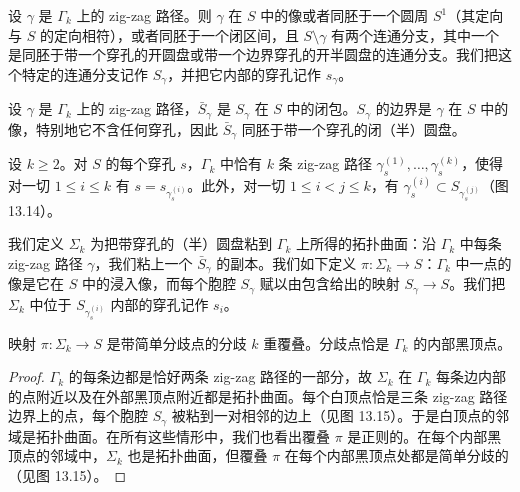 
\begin{proposition}[13.16]
设 $\gamma$ 是 $\Gamma_k$ 上的 zig-zag 路径。则 $\gamma$ 在 $S$ 中的像或者同胚于一个圆周 $S^1$（其定向与 $S$ 的定向相符），或者同胚于一个闭区间，且 $S\setminus\gamma$ 有两个连通分支，其中一个是同胚于带一个穿孔的开圆盘或带一个边界穿孔的开半圆盘的连通分支。我们把这个特定的连通分支记作 $S_\gamma$，并把它内部的穿孔记作 $s_\gamma$。
\end{proposition}

设 $\gamma$ 是 $\Gamma_k$ 上的 zig-zag 路径，$\bar S_\gamma$ 是 $S_\gamma$ 在 $S$ 中的闭包。$S_\gamma$ 的边界是 $\gamma$ 在 $S$ 中的像，特别地它不含任何穿孔，因此 $\bar S_\gamma$ 同胚于带一个穿孔的闭（半）圆盘。

\begin{lemma}[13.17]
设 $k\ge2$。对 $S$ 的每个穿孔 $s$，$\Gamma_k$ 中恰有 $k$ 条 zig-zag 路径 $\gamma_s^{(1)},\dots,\gamma_s^{(k)}$，使得对一切 $1\le i\le k$ 有 $s=s_{\gamma_s^{(i)}}$。此外，对一切 $1\le i<j\le k$，有 $\gamma_s^{(i)}\subset S_{\gamma_s^{(j)}}$（图 13.14）。
\end{lemma}


我们定义 $\Sigma_k$ 为把带穿孔的（半）圆盘粘到 $\Gamma_k$ 上所得的拓扑曲面：沿 $\Gamma_k$ 中每条 zig-zag 路径 $\gamma$，我们粘上一个 $\bar S_\gamma$ 的副本。我们如下定义 $\pi\colon\Sigma_k\to S$：$\Gamma_k$ 中一点的像是它在 $S$ 中的浸入像，而每个胞腔 $S_\gamma$
赋以由包含给出的映射 $S_\gamma\to S$。我们把 $\Sigma_k$ 中位于 $S_{\gamma_s^{(i)}}$ 内部的穿孔记作 $s_i$。

\begin{proposition}[13.18]
映射 $\pi\colon\Sigma_k\to S$ 是带简单分歧点的分歧 $k$ 重覆叠。分歧点恰是 $\Gamma_k$ 的内部黑顶点。
\end{proposition}

\begin{proof}
$\Gamma_k$ 的每条边都是恰好两条 zig-zag 路径的一部分，故 $\Sigma_k$ 在 $\Gamma_k$ 每条边内部的点附近以及在外部黑顶点附近都是拓扑曲面。每个白顶点恰是三条 zig-zag 路径边界上的点，每个胞腔 $S_\gamma$ 被粘到一对相邻的边上（见图 13.15）。于是白顶点的邻域是拓扑曲面。在所有这些情形中，我们也看出覆叠 $\pi$ 是正则的。在每个内部黑顶点的邻域中，$\Sigma_k$ 也是拓扑曲面，但覆叠 $\pi$ 在每个内部黑顶点处都是简单分歧的（见图 13.15）。
\end{proof}

